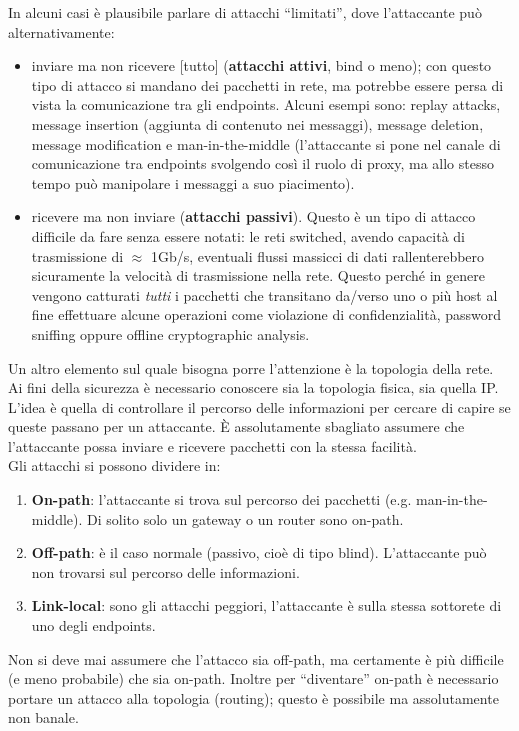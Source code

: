 In alcuni casi è plausibile parlare di attacchi “limitati”, dove l'attaccante può alternativamente:
\begin{itemize}
	\item inviare ma non ricevere [tutto] (\textbf{attacchi attivi}, bind o meno); con questo tipo di attacco si mandano dei pacchetti in rete, ma potrebbe essere persa di vista la comunicazione tra gli endpoints. Alcuni esempi sono: replay attacks, message insertion (aggiunta di contenuto nei messaggi), message deletion, message modification e man-in-the-middle (l'attaccante si pone nel canale di comunicazione tra endpoints svolgendo così il ruolo di proxy, ma allo stesso tempo può manipolare i messaggi a suo piacimento).
	\item ricevere ma non inviare (\textbf{attacchi passivi}). Questo è un tipo di attacco difficile da fare senza essere notati: le reti switched, avendo capacità di trasmissione di $\approx$ 1Gb/s, eventuali flussi massicci di dati rallenterebbero sicuramente la velocità di trasmissione nella rete. Questo perché in genere vengono catturati \textit{tutti} i pacchetti che transitano da/verso uno o più host al fine effettuare alcune operazioni come violazione di confidenzialità, password sniffing oppure offline cryptographic analysis.
\end{itemize}
Un altro elemento sul quale bisogna porre l'attenzione è la topologia della rete. Ai fini della sicurezza è necessario conoscere sia la topologia fisica, sia quella IP. L'idea è quella di controllare il percorso delle informazioni per cercare di capire se queste passano per un attaccante. È assolutamente sbagliato assumere che l'attaccante possa inviare e ricevere pacchetti con la stessa facilità.\\
Gli attacchi si possono dividere in:
\begin{enumerate}
	\item \textbf{On-path}: l'attaccante si trova sul percorso dei pacchetti (e.g. man-in-the-middle). Di solito solo un gateway o un router sono on-path.
	\item \textbf{Off-path}: è il caso normale (passivo, cioè di tipo blind). L'attaccante può non trovarsi sul percorso delle informazioni.
	\item \textbf{Link-local}: sono gli attacchi peggiori, l'attaccante è sulla stessa sottorete di uno degli endpoints.
\end{enumerate}
Non si deve mai assumere che l'attacco sia off-path, ma certamente è più difficile (e meno probabile) che sia on-path. Inoltre per “diventare” on-path è necessario portare un attacco alla topologia (routing); questo è possibile ma assolutamente non banale.\\
